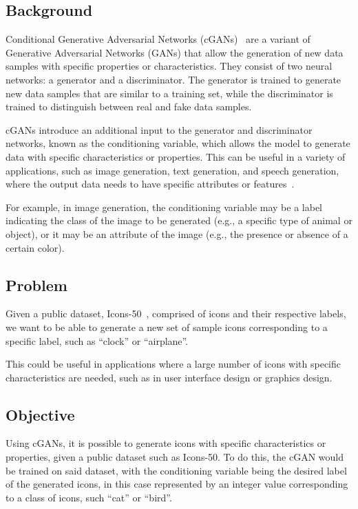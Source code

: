 \subsection{Background}\label{subsec:background}
Conditional Generative Adversarial Networks (cGANs)~\cite{Mirza2014} are a variant of Generative Adversarial Networks
(GANs) that allow the generation of new data samples with specific properties or characteristics.
They consist of two neural networks: a generator and a discriminator.
The generator is trained to generate new data samples that are similar to a training set, while the discriminator is
trained to distinguish between real and fake data samples.

cGANs introduce an additional input to the generator and discriminator networks, known as the conditioning variable,
which allows the model to generate data with specific characteristics or properties.
This can be useful in a variety of applications, such as image generation, text generation, and speech generation, where
the output data needs to have specific attributes or features~\cite{Mirza2014}.

For example, in image generation, the conditioning variable may be a label indicating the class of the image to be generated (e.g., a specific type of animal or object), or it may be an attribute of the image (e.g., the presence or absence of a certain color).

\subsection{Problem}\label{subsec:problem}
Given a public dataset, Icons-50~\cite{Icons50, Hendrycks2018}, comprised of icons and their respective labels, we want to be able to generate a new set of sample icons corresponding to a specific label, such as ``clock'' or ``airplane''.

This could be useful in applications where a large number of icons with specific characteristics are needed, such as in user interface design or graphics design.

\subsection{Objective}\label{subsec:objective}
Using cGANs, it is possible to generate icons with specific characteristics or properties, given a public dataset such as Icons-50.
To do this, the cGAN would be trained on said dataset, with the conditioning variable being the desired label of the generated icons, in this case represented by an integer value corresponding to a class of icons, such ``cat'' or ``bird''.


